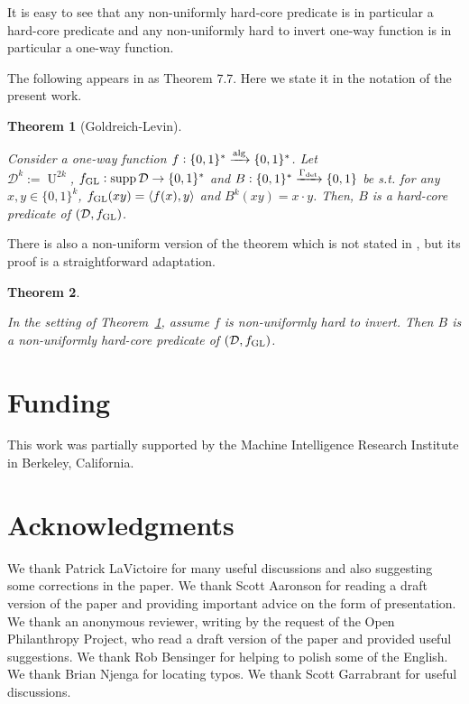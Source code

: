 \documentclass[11pt]{article}
\numberwithin{equation}{section}
\theoremstyle{definition}
\theoremstyle{plain}
\newtheorem{theorem}{Theorem}[section]
\newcommand{\Bool}{\{0,1\}}
\newcommand{\Words}{{\Bool^*}}
\newcommand{\WordsLen}[1]{{\Bool^{#1}}}
\DeclareMathOperator{\Supp}{supp}
\DeclareMathOperator{\Un}{U}
\newcommand{\Chev}[1]{\langle #1 \rangle}
\newcommand{\Dist}{\mathcal{D}}
\newcommand{\Alg}{\xrightarrow{\textnormal{alg}}}
\begin{document}
It is easy to see that any non-uniformly hard-core predicate is in particular a hard-core predicate and any non-uniformly hard to invert one-way function is in particular a one-way function.

The following appears in \cite{Goldreich_2008} as Theorem 7.7. Here we state it in the notation of the present work.

\begin{theorem}[Goldreich-Levin]
\label{thm:goldreich_levin}

Consider a one-way function ${f: \Words \Alg \Words}$. Let\\ $\Dist^k:=\Un^{2k}$, $f_{\textnormal{GL}}: \Supp \Dist \rightarrow \Words$ and ${B: \Words \xrightarrow{\Gamma_{\textnormal{det}}} \Bool}$ be s.t. for any $x,y \in \WordsLen{k}$, $f_{\textnormal{GL}}(xy)=\Chev{f(x),y}$ and ${B^k(xy)=x \cdot y}$. Then, $B$ is a hard-core predicate of $(\Dist, f_{\textnormal{GL}})$.

\end{theorem}

There is also a non-uniform version of the theorem which is not stated in \cite{Goldreich_2008}, but its proof is a straightforward adaptation.

\begin{theorem}
\label{thm:goldreich_levin_circ}

In the setting of Theorem~\ref{thm:goldreich_levin}, assume $f$ is non-uniformly hard to invert. Then $B$ is a non-uniformly hard-core predicate of $(\Dist, f_{\textnormal{GL}})$.
\end{theorem}

\section*{Funding}

This work was partially supported by the Machine Intelligence Research Institute in Berkeley, California.

\section*{Acknowledgments}

We thank Patrick LaVictoire for many useful discussions and also suggesting some corrections in the paper. We thank Scott Aaronson for reading a draft version of the paper and providing important advice on the form of presentation. We thank an anonymous reviewer, writing by the request of the Open Philanthropy Project, who read a draft version of the paper and provided useful suggestions. We thank Rob Bensinger for helping to polish some of the English. We thank Brian Njenga for locating typos. We thank Scott Garrabrant for useful discussions.



\end{document}
